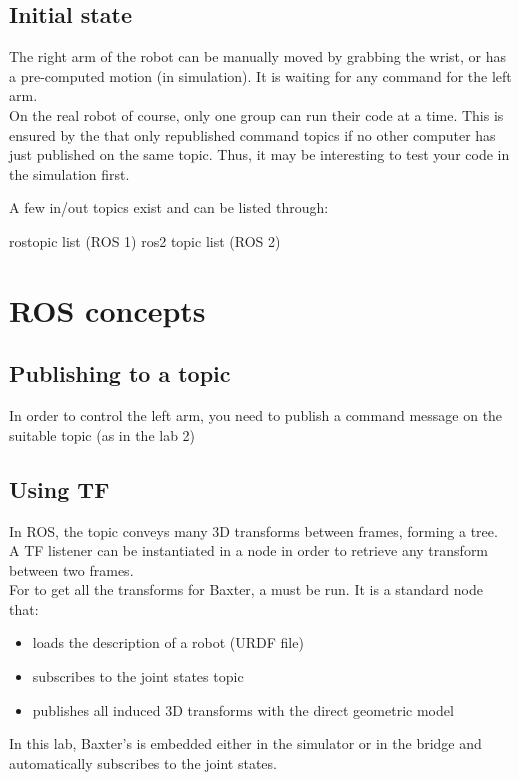 \documentclass{ecnreport}
\begin{document}
\subsection{Initial state}

The right arm of the robot can be manually moved by grabbing the wrist, or has a pre-computed motion (in simulation). 
It is waiting for any command for the left arm.\\

On the real robot of course, only one group can run their code at a time. This is ensured by the  that only republished command topics if no other computer has just published on the same topic. Thus, it may be interesting to test your code in the simulation first.

A few in/out topics exist and can be listed through:
\begin{bashcodelarge}
rostopic list (ROS 1)
ros2 topic list (ROS 2)
\end{bashcodelarge}


\section{ROS concepts}

\subsection{Publishing to a topic}

In order to control the left arm, you need to publish a command message on the suitable topic (as in the lab 2)

\subsection{Using TF}

In ROS, the  topic conveys many 3D transforms between frames, forming a tree. A TF listener can be instantiated in a node in order to retrieve any transform between two frames. \\

For  to get all the transforms for Baxter, a  must be run. It is a standard node that:
\begin{itemize}
 \item loads the description of a robot (URDF file)
 \item subscribes to the joint states topic
 \item publishes all induced 3D transforms with the direct geometric model
\end{itemize}
In this lab, Baxter's  is embedded either in the simulator or in the bridge and automatically subscribes to the joint states.
\end{document}
